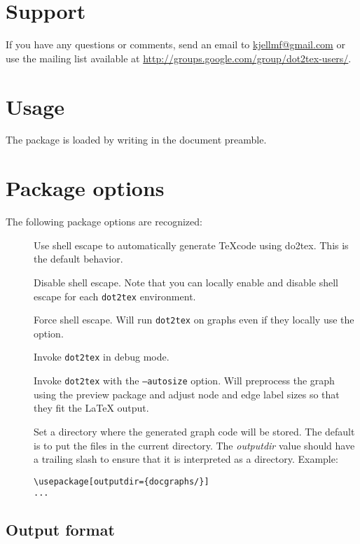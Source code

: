 \documentclass[a4paper]{ltxdoc}
\begin{document}
\section{Support}

If you have any questions or comments, send an email to \url{kjellmf@gmail.com} or use the mailing list available at \url{http://groups.google.com/group/dot2tex-users/}.

\section{Usage}

The package is loaded by writing  in the document preamble.

\section{Package options}

The following package options are recognized:

\begin{description}
\item[] Use shell escape to automatically generate \TeX code using do2tex. This is the default behavior.
\item[] Disable shell escape. Note that you can locally  enable and disable shell escape for each \texttt{dot2tex} environment.
\item[] Force shell escape. Will run \texttt{dot2tex} on graphs even if they locally use the  option.
\item[] Invoke \texttt{dot2tex} in debug mode.
\item[] Invoke \texttt{dot2tex} with the \texttt{--autosize} option. Will preprocess the graph using the preview package and adjust node and edge label sizes so that they fit the LaTeX output.
\item[] Set a directory where the generated graph code will be stored. The default is to put the files in the current directory. The \emph{outputdir} value should have a trailing slash to ensure that it is interpreted as a directory. Example:
\begin{verbatim}
\usepackage[outputdir={docgraphs/}]
...
\end{verbatim}
\end{description}

\subsection{Output format}
\end{document}
